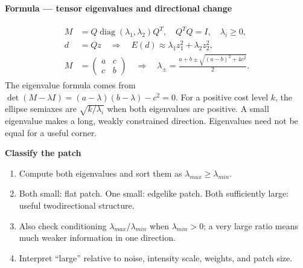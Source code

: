 \documentclass[letterpaper,11pt,english,openany,oneside]{jupyterBook}
\begin{document}
\begin{TextbookBox}
\textbf{Formula — tensor eigenvalues and directional change}\par\smallskip
\begin{equation}\label{equation:lectures/lecture05/corners:eq-lec05-eigen}
\begin{split}\begin{aligned}
M&=Q\operatorname{diag}(\lambda_1,\lambda_2)Q^T,
\quad Q^TQ=I,\quad \lambda_i\ge0,\\
d&=Qz\quad\Longrightarrow\quad E(d)\approx\lambda_1z_1^2+\lambda_2z_2^2,\\
M&=\begin{pmatrix}a&c\\c&b\end{pmatrix}
\quad\Longrightarrow\quad
\lambda_{\pm}=\frac{a+b\pm\sqrt{(a-b)^2+4c^2}}2.
\end{aligned}\end{split}
\end{equation}
\sphinxAtStartPar
The eigenvalue formula comes from \(\det(M-\lambda I)=(a-\lambda)(b-\lambda)-c^2=0\). For a positive cost level \(k\), the ellipse semiaxes are \(\sqrt{k/\lambda_i}\) when both eigenvalues are positive. A small eigenvalue makes a long, weakly constrained direction. Eigenvalues need not be equal for a useful corner.

\end{TextbookBox}

\begin{TextbookBox}
\textbf{Classify the patch}\par\smallskip
\begin{enumerate}
%
\item {}
\sphinxAtStartPar
Compute both eigenvalues and sort them as \(\lambda_{max}\ge\lambda_{min}\).

\item {}
\sphinxAtStartPar
Both small: flat patch. One small: edge\sphinxhyphen{}like patch. Both sufficiently large: useful two\sphinxhyphen{}directional structure.

\item {}
\sphinxAtStartPar
Also check conditioning \(\lambda_{max}/\lambda_{min}\) when \(\lambda_{min}>0\); a very large ratio means much weaker information in one direction.

\item {}
\sphinxAtStartPar
Interpret “large” relative to noise, intensity scale, weights, and patch size.

\end{enumerate}

\end{TextbookBox}
\end{document}
